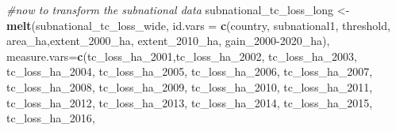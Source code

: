\documentclass[
]{article}
\newenvironment{Shaded}{\begin{snugshade}}{\end{snugshade}}
\newcommand{\AttributeTok}[1]{\textcolor[rgb]{0.13,0.29,0.53}{#1}}
\newcommand{\CommentTok}[1]{\textcolor[rgb]{0.56,0.35,0.01}{\textit{#1}}}
\newcommand{\FunctionTok}[1]{\textcolor[rgb]{0.13,0.29,0.53}{\textbf{#1}}}
\newcommand{\NormalTok}[1]{#1}
\newcommand{\OtherTok}[1]{\textcolor[rgb]{0.56,0.35,0.01}{#1}}
\newcommand{\StringTok}[1]{\textcolor[rgb]{0.31,0.60,0.02}{#1}}
\begin{document}
\begin{Shaded}
\begin{Highlighting}[]
\CommentTok{\#now to transform the subnational data}
\NormalTok{subnational\_tc\_loss\_long }\OtherTok{\textless{}{-}} \FunctionTok{melt}\NormalTok{(subnational\_tc\_loss\_wide, }
                             \AttributeTok{id.vars =} \FunctionTok{c}\NormalTok{(}\StringTok{\textquotesingle{}country\textquotesingle{}}\NormalTok{, }\StringTok{\textquotesingle{}subnational1\textquotesingle{}}\NormalTok{, }\StringTok{\textquotesingle{}threshold\textquotesingle{}}\NormalTok{,}
                                          \StringTok{\textquotesingle{}area\_ha\textquotesingle{}}\NormalTok{,}\StringTok{\textquotesingle{}extent\_2000\_ha\textquotesingle{}}\NormalTok{, }\StringTok{\textquotesingle{}extent\_2010\_ha\textquotesingle{}}\NormalTok{, }
                                          \StringTok{\textquotesingle{}gain\_2000{-}2020\_ha\textquotesingle{}}\NormalTok{), }
                             \AttributeTok{measure.vars=}\FunctionTok{c}\NormalTok{(}\StringTok{\textquotesingle{}tc\_loss\_ha\_2001\textquotesingle{}}\NormalTok{,}\StringTok{\textquotesingle{}tc\_loss\_ha\_2002\textquotesingle{}}\NormalTok{, }
                                            \StringTok{\textquotesingle{}tc\_loss\_ha\_2003\textquotesingle{}}\NormalTok{, }\StringTok{\textquotesingle{}tc\_loss\_ha\_2004\textquotesingle{}}\NormalTok{, }
                                            \StringTok{\textquotesingle{}tc\_loss\_ha\_2005\textquotesingle{}}\NormalTok{, }\StringTok{\textquotesingle{}tc\_loss\_ha\_2006\textquotesingle{}}\NormalTok{,}
                                            \StringTok{\textquotesingle{}tc\_loss\_ha\_2007\textquotesingle{}}\NormalTok{, }\StringTok{\textquotesingle{}tc\_loss\_ha\_2008\textquotesingle{}}\NormalTok{, }
                                            \StringTok{\textquotesingle{}tc\_loss\_ha\_2009\textquotesingle{}}\NormalTok{, }\StringTok{\textquotesingle{}tc\_loss\_ha\_2010\textquotesingle{}}\NormalTok{, }
                                            \StringTok{\textquotesingle{}tc\_loss\_ha\_2011\textquotesingle{}}\NormalTok{, }\StringTok{\textquotesingle{}tc\_loss\_ha\_2012\textquotesingle{}}\NormalTok{,}
                                            \StringTok{\textquotesingle{}tc\_loss\_ha\_2013\textquotesingle{}}\NormalTok{, }\StringTok{\textquotesingle{}tc\_loss\_ha\_2014\textquotesingle{}}\NormalTok{, }
                                            \StringTok{\textquotesingle{}tc\_loss\_ha\_2015\textquotesingle{}}\NormalTok{, }\StringTok{\textquotesingle{}tc\_loss\_ha\_2016\textquotesingle{}}\NormalTok{, }

\end{Highlighting}
\end{Shaded}
\end{document}
